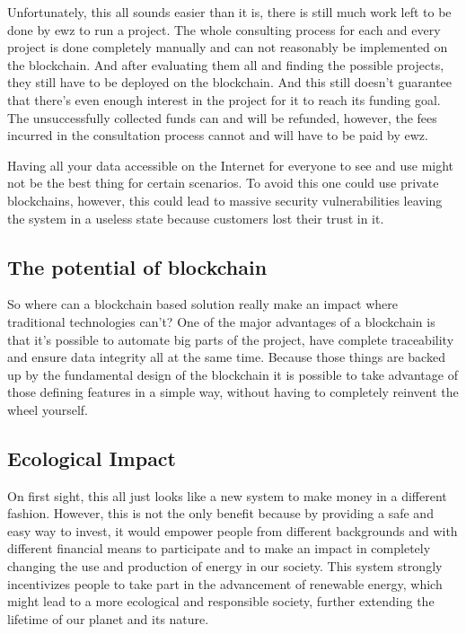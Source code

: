 Unfortunately, this all sounds easier than it is, there is still much work left to be done by ewz to run a project. The whole consulting process for each and every project is done completely manually and can not reasonably be implemented on the blockchain. And after evaluating them all and finding the possible projects, they still have to be deployed on the blockchain. And this still doesn't guarantee that there's even enough interest in the project for it to reach its funding goal. The unsuccessfully collected funds can and will be refunded, however, the fees incurred in the consultation process cannot and will have to be paid by ewz.

Having all your data accessible on the Internet for everyone to see and use might not be the best thing for certain scenarios. To avoid this one could use private blockchains, however, this could lead to massive security vulnerabilities leaving the system in a useless state because customers lost their trust in it.

\subsection{The potential of blockchain}
So where can a blockchain based solution really make an impact where traditional technologies can't? One of the major advantages of a blockchain is that it's possible to automate big parts of the project, have complete traceability and ensure data integrity all at the same time. Because those things are backed up by the fundamental design of the blockchain it is possible to take advantage of those defining features in a simple way, without having to completely reinvent the wheel yourself.

\subsection{Ecological Impact}
On first sight, this all just looks like a new system to make money in a different fashion. However, this is not the only benefit because by providing a safe and easy way to invest, it would empower people from different backgrounds and with different financial means to participate and to make an impact in completely changing the use and production of energy in our society. This system strongly incentivizes people to take part in the advancement of renewable energy, which might lead to a more ecological and responsible society, further extending the lifetime of our planet and its nature.



